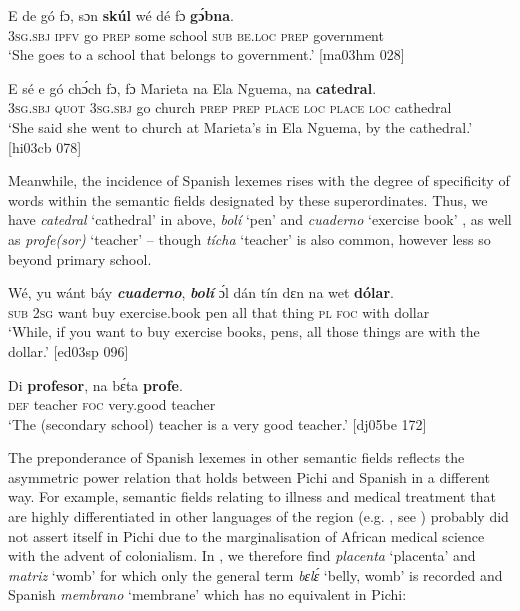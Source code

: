 \ea%
    \label{ex:key:1757}
    \gll E    de  gó  fɔ,  sɔn    \textbf{skúl}    wé  dé    fɔ  \textbf{gɔ́bna}.\\
\textsc{3sg.sbj}  \textsc{ipfv}  go  \textsc{prep}  some  school  \textsc{sub}  \textsc{be.loc}  \textsc{prep}  government\\

\glt ‘She goes to a school that belongs to government.’ [ma03hm 028]
\z


\ea%
    \label{ex:key:1758}
    \gll E    sé  e    gó  chɔ́ch  fɔ,  fɔ  Marieta  na  {Ela Nguema},
na  \textbf{catedral}.\\
\textsc{3sg.sbj}  \textsc{quot}  \textsc{3sg.sbj}  go  church  \textsc{prep}  \textsc{prep}  \textsc{place}  \textsc{loc}  \textsc{place}
\textsc{loc}  cathedral\\

\glt ‘She said she went to church at Marieta’s in Ela Nguema, by the cathedral.’ [hi03cb 078]
\z

Meanwhile, the incidence of Spanish lexemes rises with the degree of specificity of words within the semantic fields designated by these superordinates. Thus, we have \textit{catedral} ‘cathedral’ in  above, \textit{bolí} ‘pen’ and \textit{cuaderno} ‘exercise book’ , as well as \textit{profe(sor)} ‘teacher’ – though \textit{tícha} ‘teacher’ is also common, however less so beyond primary school. 


\ea%
    \label{ex:key:1759}
    \gll Wé,  yu  wánt  báy  \textbf{\textit{cuaderno}},    \textbf{\textit{bolí}}  ɔ́l  dán  tín    dɛn
na  wet    \textbf{dólar}.\\
\textsc{sub}  \textsc{2sg}  want  buy  exercise.book    pen  all  that  thing  \textsc{pl}  
\textsc{foc}  with    dollar\\

\glt ‘While, if you want to buy exercise books, pens, all those things are
with the dollar.’ [ed03sp 096]
\z


\ea%
    \label{ex:key:1760}
    \gll Di  \textbf{profesor},    na  bɛ́ta     \textbf{profe}.\\
\textsc{def}  teacher    \textsc{foc}  very.good  teacher\\

\glt ‘The (secondary school) teacher is a very good teacher.’ [dj05be 172]
\z

The preponderance of Spanish lexemes in other semantic fields reflects the asymmetric power relation that holds between Pichi and Spanish in a different way. For example, semantic fields relating to illness and medical treatment that are highly differentiated in other languages of the region (e.g. , see \citet{Adegbite1993}) probably did not assert itself in Pichi due to the marginalisation of African medical science with the advent of colonialism. In , we therefore find \textit{placenta} ‘placenta’ and \textit{matriz} ‘womb’ for which only the general term \textit{bɛlɛ́} ‘belly, womb’ is recorded and Spanish \textit{membrano} ‘membrane’ which has no equivalent in Pichi: 


